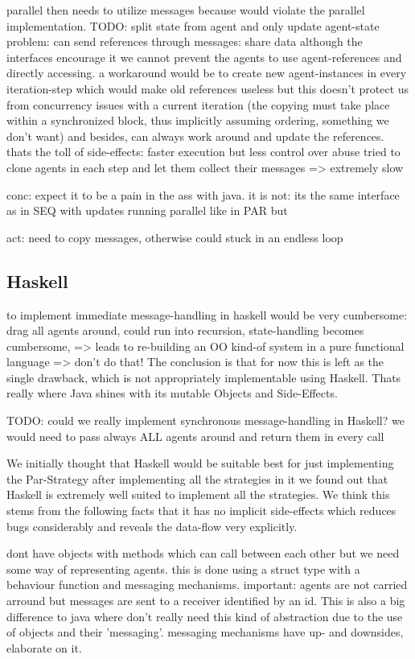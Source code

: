 parallel then needs to utilize messages because would violate the parallel implementation. TODO: split state from agent and only update agent-state
problem: can send references through messages: share data
although the interfaces encourage it we cannot prevent the agents to use agent-references and directly accessing. a workaround would be to create new agent-instances in every iteration-step which would make old references useless but this doesn't protect us from concurrency issues with a current iteration (the copying must take place within a synchronized block, thus implicitly assuming ordering, something we don't want) and besides, can always work around and update the references.
thats the toll of side-effects: faster execution but less control over abuse
tried to clone agents in each step and let them collect their messages => extremely slow

conc: expect it to be a pain in the ass with java. it is not: its the same interface as in SEQ with updates running parallel like in PAR but 

act: need to copy messages, otherwise could stuck in an endless loop

\subsection{Haskell}
to implement immediate message-handling in haskell would be very cumbersome: 
drag all agents around, could run into recursion, state-handling becomes cumbersome, => leads to re-building an OO kind-of system in a pure functional language => don't do that! The conclusion is that for now this is left as the single drawback, which is not appropriately implementable using Haskell. Thats really where Java shines with its mutable Objects and Side-Effects.

TODO: could we really implement synchronous message-handling in Haskell? we would need to pass always ALL agents around and return them in every call

We initially thought that Haskell would be suitable best for just implementing the Par-Strategy after implementing all the strategies in it we found out that Haskell is extremely well suited to implement all the strategies. We think this stems from the following facts that it has no implicit side-effects which reduces bugs considerably and reveals the data-flow very explicitly.
 
dont have objects with methods which can call between each other but we need some way of representing agents. this is done using a struct type with a behaviour function and messaging mechanisms. important: agents are not carried arround but messages are sent to a receiver identified by an id. This is also a big difference to java where don't really need this kind of abstraction due to the use of objects and their 'messaging'. messaging mechanisms have up- and downsides, elaborate on it.

